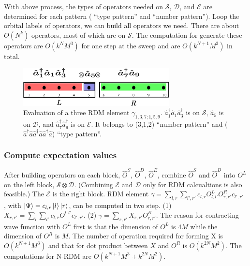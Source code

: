 With above process, the types of operators needed on $\mathcal{S}$, $\mathcal{D}$, and $\mathcal{E}$ are determined for each pattern ( ``type pattern'' and ``number pattern''). Loop the orbital labels of operators, we can build all operators we need. There are about $O(N^k)$ operators, most of which are on $\mathcal{S}$.
  The computation for generate these operators are $O(k^NM^3)$ for one step at the sweep and are $O(k^{N+1}M^3)$ in total.   

\begin{figure}\label{fig:operator_split}
  \includegraphics[width=8cm]{operator_split.eps}
  \caption{Evaluation of a three RDM element $\gamma_{1,3,7;1,5,9}$. $\hat{a}_1^\dagger\hat{a}_1\hat{a}^\dagger_3$ is on $\mathcal{S}$, $\hat{a}_5$ is on $\mathcal{D}$, and $\hat{a}^\dagger_7\hat{a}^\dagger_9$ is on $\mathcal{E}$. It belongs to (3,1,2) ``number pattern'' and ($\hat{a}^\dagger\hat{a}\hat{a}^\dagger\hat{a}\hat{a}^\dagger\hat{a}$) ``type pattern''.}
\end{figure}

\subsubsection{Compute expectation values}

  After building operators on each block, $\hat{O}^S$, $\hat{O}^D$, $\hat{O}^E$, combine $\hat{O}^S$ and $\hat{O}^D$ into $O^L$ on the left block, $\mathcal{S}\otimes \mathcal{D}$. (Combining $\mathcal{E}$ and $\mathcal{D}$ only for RDM calcualtions is also feasible.) The $\mathcal{E}$ is the right block.
  RDM element $\gamma = \sum_{l,r}\sum_{l',r'} c_{l,r} O^{L}_{l,l'} O^R_{r,r'}c_{l',r'}$ , with $\ket{\Psi} = c_{l,r}\ket{l}\ket{r}$, can be computed in two step. (1) $X_{r,r'} = \sum_{l}\sum_{l'} c_{l,r} O^{l,l'} c_{l',r'}$. (2) $\gamma = \sum_{r,r'} X_{r,r'} O^R_{r,r'}$.
  The reason for contracting wave function with $O^L$ first is that the dimension of $O^L$ is $4M$ while the dimension of $O^R$ is $M$.
  The number of operation required for forming X is $O(k^{N+1}M^3)$ and that for dot product between $X$ and $O^R$ is $O(k^{2N}M^2)$. 
  The computations for N-RDM are $O(k^{N+1}M^3+k^{2N}M^2)$.




